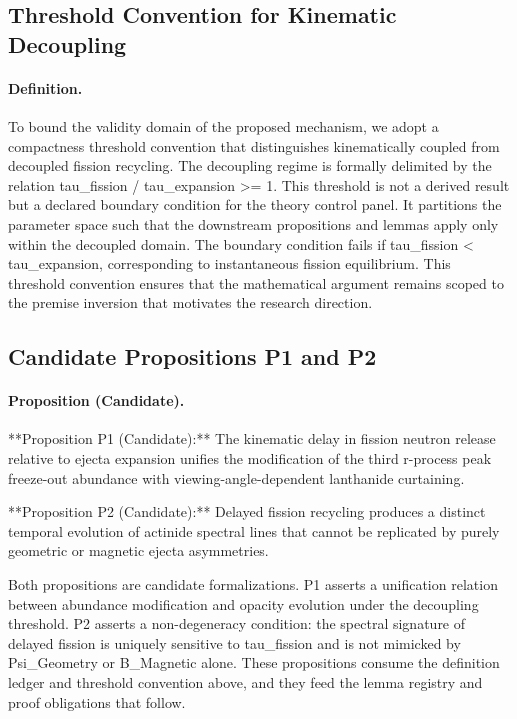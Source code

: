 \documentclass[conference]{IEEEtran}
\begin{document}
\subsection{Threshold Convention for Kinematic Decoupling}
\paragraph{Definition.} To bound the validity domain of the proposed mechanism, we adopt a compactness threshold convention that distinguishes kinematically coupled from decoupled fission recycling. The decoupling regime is formally delimited by the relation tau\_fission / tau\_expansion >= 1. This threshold is not a derived result but a declared boundary condition for the theory control panel. It partitions the parameter space such that the downstream propositions and lemmas apply only within the decoupled domain. The boundary condition fails if tau\_fission < tau\_expansion, corresponding to instantaneous fission equilibrium. This threshold convention ensures that the mathematical argument remains scoped to the premise inversion that motivates the research direction.

\subsection{Candidate Propositions P1 and P2}
\paragraph{Proposition (Candidate).} **Proposition P1 (Candidate):** The kinematic delay in fission neutron release relative to ejecta expansion unifies the modification of the third r-process peak freeze-out abundance with viewing-angle-dependent lanthanide curtaining.

**Proposition P2 (Candidate):** Delayed fission recycling produces a distinct temporal evolution of actinide spectral lines that cannot be replicated by purely geometric or magnetic ejecta asymmetries.

Both propositions are candidate formalizations. P1 asserts a unification relation between abundance modification and opacity evolution under the decoupling threshold. P2 asserts a non-degeneracy condition: the spectral signature of delayed fission is uniquely sensitive to tau\_fission and is not mimicked by Psi\_Geometry or B\_Magnetic alone. These propositions consume the definition ledger and threshold convention above, and they feed the lemma registry and proof obligations that follow.
\end{document}
